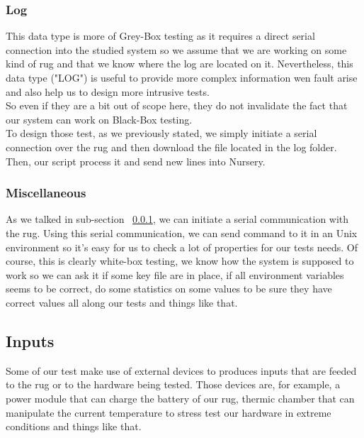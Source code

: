 \documentclass[12pt]{article}
\theoremstyle{definition}
\theoremstyle{definition}
\theoremstyle{remark}
\begin{document}
\subsubsection{Log}
\label{subsec:log}

This data type is more of Grey-Box testing as it requires a direct serial connection into the studied system so we assume that we  are working on some kind of \gls{rug} and that we know where the log are located on it. Nevertheless, this data type ("LOG") is useful to provide more complex information wen fault arise and also help us to design more intrusive tests.\\

So even if they are a bit out of scope here, they do not invalidate the fact that our system can work on Black-Box testing.\\

To design those test, as we previously stated, we simply initiate a serial connection over the \gls{rug} and then download the file located in the log folder. Then, our script process it and send new lines into Nursery.

\subsubsection{Miscellaneous}
\label{subsec:misc}

As we talked in sub-section ~\ref{subsec:log}, we can initiate a serial communication with the \gls{rug}. Using this serial communication, we can send command to it in an Unix environment so it's easy for us to check a lot of properties for our tests needs. Of course, this is clearly white-box testing, we know how the system is supposed to work so we can ask it if some key file are in place, if all environment variables seems to be correct, do some statistics on some values to be sure they have correct values all along our tests and things like that.\\

\subsection{Inputs}

Some of our test make use of external devices to produces inputs that are feeded to the \gls{rug} or to the hardware being tested. Those devices are, for example, a power module that can charge the battery of our \gls{rug}, thermic chamber that can manipulate the current temperature to stress test our hardware in extreme conditions and things like that.\\
\end{document}
